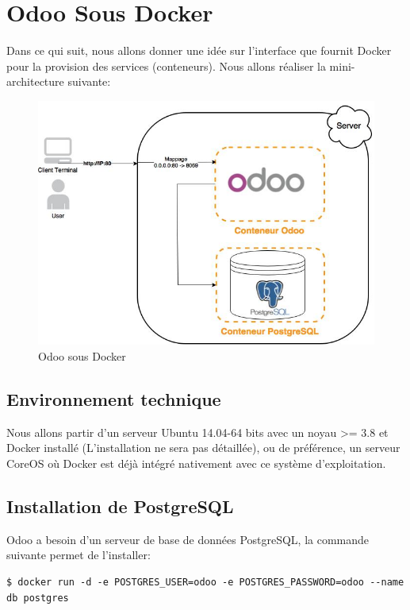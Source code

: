 \chapter{Odoo Sous Docker}
\label{annexe:A}

	Dans ce qui suit, nous allons donner une idée sur l'interface que fournit Docker pour la provision des services (conteneurs). Nous allons réaliser la mini-architecture suivante:
	
	\begin{figure}[H]
	\centering
	\includegraphics [scale=0.5]{biblio/odoo.jpg}
	\caption{Odoo sous Docker}
	\label{fig:}
	\end{figure}

\section*{Environnement technique}
	
	Nous allons partir d'un serveur Ubuntu 14.04-64 bits avec un noyau >= 3.8 et Docker installé (L'installation ne sera pas détaillée), ou de préférence, un serveur CoreOS où Docker est déjà intégré nativement avec ce système d'exploitation.

\section*{Installation de PostgreSQL}

	Odoo a besoin d'un serveur de base de données PostgreSQL, la commande suivante permet de l'installer:

	\begin{lstlisting}[caption=Installation de PostgreSQL]
		$ docker run -d -e POSTGRES_USER=odoo -e POSTGRES_PASSWORD=odoo --name db postgres
	\end{lstlisting}




